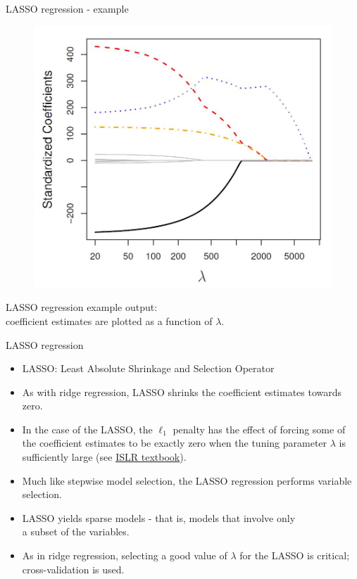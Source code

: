 \documentclass{beamer}
\begin{document}
\begin{frame}{LASSO regression - example}
\vspace{-1cm}
\begin{figure}
\includegraphics[scale=0.30]{IMG/Lasso.jpg}
\end{figure}
\vspace{-0.5cm}
\centering LASSO regression example output: \\coefficient estimates are plotted as a function of $\lambda$.
\end{frame}
\begin{frame}{LASSO regression}

\begin{itemize}
\item LASSO: Least Absolute Shrinkage and Selection Operator
\medskip
\item As with ridge regression, LASSO shrinks the coefficient
estimates towards zero.
\medskip
\item In the case of the LASSO, the $\ell_1$ penalty has the
effect of forcing some of the coefficient estimates to be
exactly zero when the tuning parameter $\lambda$ is
sufficiently large (see \textcolor{blue}{\underline{\href{http://www-bcf.usc.edu/~gareth/ISL/}{ISLR textbook}}}).
\medskip
\item Much like stepwise model selection, the LASSO regression performs variable selection.
\medskip
\item LASSO yields sparse models - that is, models that involve only \\a subset of the variables.
\medskip
\item As in ridge regression, selecting a good value of $\lambda$ for the
LASSO is critical; cross-validation is used.
\end{itemize}
\end{frame}
\end{document}
